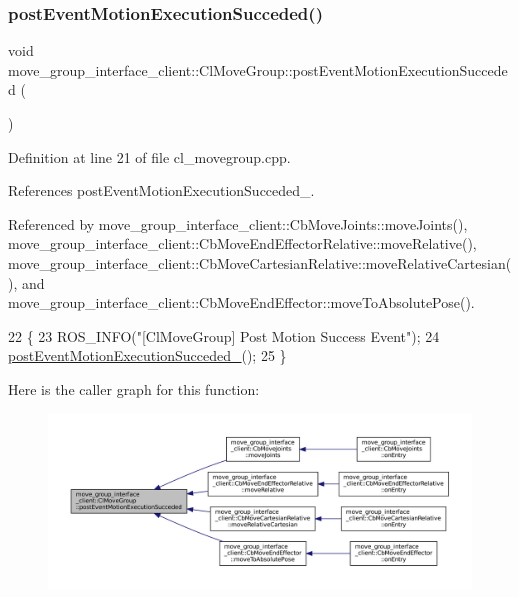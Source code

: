 \subsubsection{\texorpdfstring{post\+Event\+Motion\+Execution\+Succeded()}{postEventMotionExecutionSucceded()}}
{\footnotesize\ttfamily void move\+\_\+group\+\_\+interface\+\_\+client\+::\+Cl\+Move\+Group\+::post\+Event\+Motion\+Execution\+Succeded (\begin{DoxyParamCaption}{ }\end{DoxyParamCaption})}



Definition at line 21 of file cl\+\_\+movegroup.\+cpp.



References post\+Event\+Motion\+Execution\+Succeded\+\_\+.



Referenced by move\+\_\+group\+\_\+interface\+\_\+client\+::\+Cb\+Move\+Joints\+::move\+Joints(), move\+\_\+group\+\_\+interface\+\_\+client\+::\+Cb\+Move\+End\+Effector\+Relative\+::move\+Relative(), move\+\_\+group\+\_\+interface\+\_\+client\+::\+Cb\+Move\+Cartesian\+Relative\+::move\+Relative\+Cartesian(), and move\+\_\+group\+\_\+interface\+\_\+client\+::\+Cb\+Move\+End\+Effector\+::move\+To\+Absolute\+Pose().


\begin{DoxyCode}
22 \{
23     ROS\_INFO(\textcolor{stringliteral}{"[ClMoveGroup] Post Motion Success Event"});
24     \hyperlink{classmove__group__interface__client_1_1ClMoveGroup_a76aa1b70c574348aa734f727fd5ef373}{postEventMotionExecutionSucceded\_}();
25 \}
\end{DoxyCode}
Here is the caller graph for this function\+:
\nopagebreak
\begin{figure}[H]
\begin{center}
\leavevmode
\includegraphics[width=350pt]{classmove__group__interface__client_1_1ClMoveGroup_a1b617e0018790b8ebf23aea75eb7acba_icgraph}
\end{center}
\end{figure}


